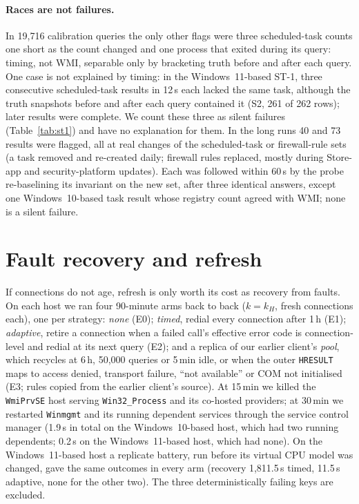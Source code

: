 \documentclass[letterpaper,twocolumn,10pt]{article}
\newcommand{\code}[1]{\texttt{\small #1}}
\begin{document}
\paragraph{Races are not failures.}
In 19{,}716 calibration queries the only other flags were three scheduled-task counts one short as the count changed and one process that exited during its query: timing, not WMI, separable only by bracketing truth before and after each query.
One case is not explained by timing: in the Windows~11-based ST-1, three consecutive scheduled-task results in 12\,s each lacked the same task, although the truth snapshots before and after each query contained it (S2, 261 of 262 rows); later results were complete.
We count these three as silent failures (Table~\ref{tab:st1}) and have no explanation for them.
In the long runs 40 and 73 results were flagged, all at real changes of the scheduled-task or firewall-rule sets (a task removed and re-created daily; firewall rules replaced, mostly during Store-app and security-platform updates).
Each was followed within 60\,s by the probe re-baselining its invariant on the new set, after three identical answers, except one Windows~10-based task result whose registry count agreed with WMI; none is a silent failure.

\section{Fault recovery and refresh}\label{sec:fault}
If connections do not age, refresh is only worth its cost as recovery from faults.
On each host we ran four 90-minute arms back to back ($k=k_H$, fresh connections each), one per strategy: \emph{none} (E0); \emph{timed}, redial every connection after 1\,h (E1); \emph{adaptive}, retire a connection when a failed call's effective error code is connection-level and redial at its next query (E2); and a replica of our earlier client's \emph{pool}, which recycles at 6\,h, 50{,}000 queries or 5\,min idle, or when the outer \code{HRESULT} maps to access denied, transport failure, ``not available'' or COM not initialised (E3; rules copied from the earlier client's source).
At 15\,min we killed the \code{WmiPrvSE} host serving \code{Win32\_Process} and its co-hosted providers; at 30\,min we restarted \code{Winmgmt} and its running dependent services through the service control manager (1.9\,s in total on the Windows~10-based host, which had two running dependents; 0.2\,s on the Windows~11-based host, which had none).
On the Windows~11-based host a replicate battery, run before its virtual CPU model was changed, gave the same outcomes in every arm (recovery 1{,}811.5\,s timed, 11.5\,s adaptive, none for the other two).
The three deterministically failing keys are excluded.
\end{document}
